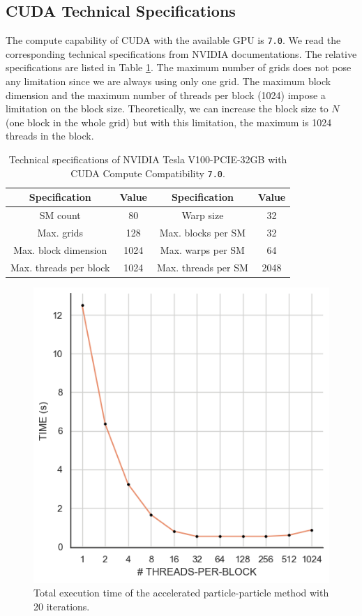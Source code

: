 \documentclass[10pt,journal,compsocconf]{IEEEtran}
\newcommand{\code}[1]{{\small \texttt{#1}}}
\begin{document}
\subsection{CUDA Technical Specifications}

The compute capability of CUDA with the available GPU is \code{7.0}. We read the corresponding technical specifications from NVIDIA documentations. The relative specifications are listed in Table \ref{tab:specs}. The maximum number of grids does not pose any limitation since we are always using only one grid. The maximum block dimension and the maximum number of threads per block (1024) impose a limitation on the block size. Theoretically, we can increase the block size to $N$ (one block in the whole grid) but with this limitation, the maximum is 1024 threads in the block.

\begin{table}[h]
    \centering
    \caption{Technical specifications of {NVIDIA Tesla V100-PCIE-32GB} with CUDA Compute Compatibility \code{7.0}.}
    \begin{tabular}{|c|c||c|c|}
        \hline
        Specification & Value & Specification & Value \\
        \hline
        SM count & 80 & Warp size & 32\\
        Max. grids & 128 & Max. blocks per SM & 32\\
        Max. block dimension & 1024 & Max. warps per SM & 64\\
        Max. threads per block & 1024 & Max. threads per SM & 2048\\
        \hline
    \end{tabular}
    \label{tab:specs}
\end{table}

\begin{figure}[ht]
  \centering
  \includegraphics[width=.35\textwidth]{img/threadsperblock.png}
  \caption{Total execution time of the accelerated particle-particle method with 20 iterations.}
  \label{fig:threadsperblock}
\end{figure}
\end{document}
